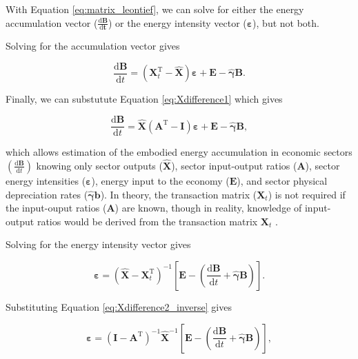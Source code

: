\documentclass[authoryear,preprint,review,12pt]{elsarticle}
\let\oldhat\hat
\renewcommand{\vec}[1]{\mathbf{#1}}
\renewcommand{\hat}[1]{\oldhat{\mathbf{#1}}}
\begin{document}
With Equation \ref{eq:matrix_leontief}, we can solve for either the energy accumulation vector ($\vec{\frac{\mathrm{d}B}{\mathrm{d}t}}$) or the energy intensity vector ($\vec{\varepsilon}$), but not both. 

Solving for the accumulation vector gives

\begin{equation} \label{eq:dB_dt_leontief}
	\frac{\mathrm{d}\vec{B}}{\mathrm{d}t} = (\vec{X}_{t}^{\mathrm{T}} - \hat{\vec{X}})\vec{\varepsilon} + \vec{E} - \hat{\vec{\gamma}}\vec{B}.
\end{equation}

\noindent Finally, we can substutute Equation \ref{eq:Xdifference1} which gives

\begin{equation} \label{eq:dB_dt_leontief_with_A}
	\frac{\mathrm{d}\vec{B}}{\mathrm{d}t} = \hat{\vec{X}} (\vec{A}^{\mathrm{T}} - \vec{I}) \vec{\varepsilon} + \vec{E} - \hat{\vec{\gamma}}\vec{B},
\end{equation}

\noindent which allows estimation of the embodied energy accumulation in economic sectors $\left(\frac{\mathrm{d}\vec{B}}{\mathrm{d}t}\right)$ knowing only sector outputs ($\hat{\vec{X}}$), sector input-output ratios ($\vec{A}$), sector energy intensities ($\vec{\varepsilon}$), energy input to the economy ($\vec{E}$), and sector physical depreciation rates ($\hat{\vec{\gamma}}\vec{b}$). In theory, the transaction matrix ($\vec{X}_{t}$) is not required if the input-ouput ratios ($\vec{A}$) are known, though in reality, knowledge of input-output ratios would be derived from the transaction matrix $\vec{X}_{t}$ .

Solving for the energy intensity vector gives

\begin{equation} \label{eq:epsilon_leontief}
	\vec{\varepsilon} = (\hat{\vec{X}} - \vec{X}_{t}^{\mathrm{T}})^{-1}\left[\vec{E} - \left(\frac{\mathrm{d}\vec{B}}{\mathrm{d}t} + \hat{\vec{\gamma}}\vec{B}\right)\right].
\end{equation}

\noindent Substituting Equation \ref{eq:Xdifference2_inverse} gives

\begin{equation} \label{eq:epsilon_leontief_with_A}
	\vec{\varepsilon} = (\vec{I} - \vec{A}^{\mathrm{T}})^{-1}\hat{\vec{X}}^{-1}\left[\vec{E} - \left(\frac{\mathrm{d}\vec{B}}{\mathrm{d}t} + \hat{\vec{\gamma}}\vec{B}\right)\right],
\end{equation}
\end{document}
